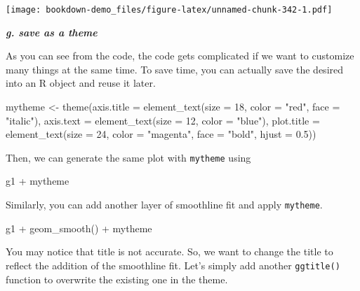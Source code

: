 \documentclass[
]{book}
\newenvironment{Shaded}{\begin{snugshade}}{\end{snugshade}}
\newcommand{\AttributeTok}[1]{\textcolor[rgb]{0.77,0.63,0.00}{#1}}
\newcommand{\DecValTok}[1]{\textcolor[rgb]{0.00,0.00,0.81}{#1}}
\newcommand{\FloatTok}[1]{\textcolor[rgb]{0.00,0.00,0.81}{#1}}
\newcommand{\FunctionTok}[1]{\textcolor[rgb]{0.00,0.00,0.00}{#1}}
\newcommand{\NormalTok}[1]{#1}
\newcommand{\OtherTok}[1]{\textcolor[rgb]{0.56,0.35,0.01}{#1}}
\newcommand{\SpecialCharTok}[1]{\textcolor[rgb]{0.00,0.00,0.00}{#1}}
\newcommand{\StringTok}[1]{\textcolor[rgb]{0.31,0.60,0.02}{#1}}
\begin{document}
\texttt{[image: bookdown-demo\_files/figure-latex/unnamed-chunk-342-1.pdf]}

\textbf{\emph{g. save as a theme}}

As you can see from the code, the code gets complicated if we want to customize many things at the same time. To save time, you can actually save the desired into an R object and reuse it later.

\begin{Shaded}
\begin{Highlighting}[]
\NormalTok{mytheme }\OtherTok{\textless{}{-}} \FunctionTok{theme}\NormalTok{(}\AttributeTok{axis.title =} \FunctionTok{element\_text}\NormalTok{(}\AttributeTok{size =} \DecValTok{18}\NormalTok{, }\AttributeTok{color =} \StringTok{"red"}\NormalTok{, }\AttributeTok{face =} \StringTok{"italic"}\NormalTok{), }\AttributeTok{axis.text =} \FunctionTok{element\_text}\NormalTok{(}\AttributeTok{size =} \DecValTok{12}\NormalTok{, }\AttributeTok{color =} \StringTok{"blue"}\NormalTok{), }\AttributeTok{plot.title =} \FunctionTok{element\_text}\NormalTok{(}\AttributeTok{size =} \DecValTok{24}\NormalTok{, }\AttributeTok{color =} \StringTok{"magenta"}\NormalTok{, }\AttributeTok{face =} \StringTok{"bold"}\NormalTok{, }\AttributeTok{hjust =} \FloatTok{0.5}\NormalTok{))}
\end{Highlighting}
\end{Shaded}

Then, we can generate the same plot with \texttt{mytheme} using

\begin{Shaded}
\begin{Highlighting}[]
\NormalTok{g1 }\SpecialCharTok{+}\NormalTok{ mytheme}
\end{Highlighting}
\end{Shaded}

Similarly, you can add another layer of smoothline fit and apply \texttt{mytheme}.

\begin{Shaded}
\begin{Highlighting}[]
\NormalTok{g1 }\SpecialCharTok{+} \FunctionTok{geom\_smooth}\NormalTok{() }\SpecialCharTok{+}\NormalTok{ mytheme}
\end{Highlighting}
\end{Shaded}

You may notice that title is not accurate. So, we want to change the title to reflect the addition of the smoothline fit. Let's simply add another \texttt{ggtitle()} function to overwrite the existing one in the theme.
\end{document}
